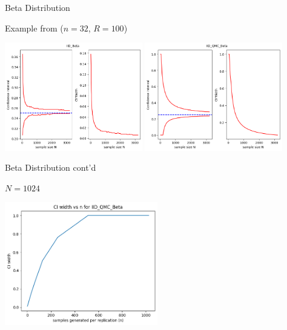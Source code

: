 \documentclass[11pt,compress,xcolor={usenames,dvipsnames},aspectratio=169]{beamer}
\begin{document}
\begin{frame}{Beta Distribution}

\vspace{-7ex}

Example from \textcite{WauRam24a} ($n=32$, $R =100$)

\centerline{
\includegraphics[width=0.45\textwidth]{Figures/IID_Beta.png} \qquad
\includegraphics[width=0.45\textwidth]{Figures/IID_QMC_Beta.png} }
    
\end{frame}

\begin{frame}{Beta Distribution cont'd}
\vspace{-7ex}

$N = 1024$
\centerline{\includegraphics[width=0.5\textwidth]{Figures/beta_vary.png}}
    
\end{frame}
\end{document}
